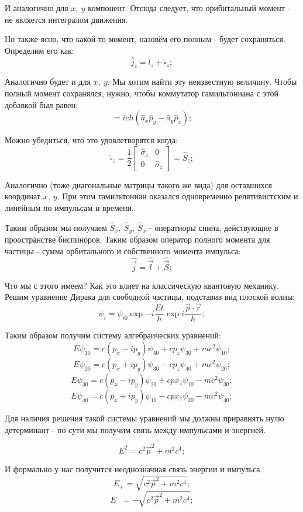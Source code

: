 \documentclass[a4paper, 14pt, russian]{article}
\newcommand{\be}{\begin{equation}}
\newcommand{\ee}{\end{equation}}
\begin{document}
	И аналогично для $x,~y$ компонент. Отсюда следует, что орибитальный момент - не является интегралом движения.

	Но также ясно, что какой-то момент, назовём его полным - будет сохраняться. Определим его как:
	\be
			\hat{j}_z = \hat{l}_z + \hat{\square}_z;
	\ee

	Аналогично будет и для $x,~y$. Мы хотим найти эту неизвестную величину. Чтобы 
	полный момент сохранялся, нужно, чтобы коммутатор гамильтониана с этой добавкой был равен:
	\be
			[\hat{H}; \hat{\square}_z] = ic \hbar (\hat{a}_x \hat{p}_y - \hat{a}_y \hat{p}_x);
	\ee

	Можно убедиться, что это удовлетворятся когда:
	\be
		\hat{\square}_z = \frac{1}{2} 
			\begin{bmatrix}
				\hat{\sigma}_z	&	0\\
				0	&	\hat{\sigma}_z
			\end{bmatrix} = \hat{S}_z;
	\ee

	Аналогично (тоже диагональные матрицы такого же вида) для оставшихся координат $x,~y$.
	При этом гамильтониан оказался одновременно релятивистским и линейным по импульсам и времени.

	Таким образом мы получаем $\hat{S}_x,~\hat{S}_y,~\hat{S}_x$ - оператиоры спина, действующие 
	в проостранстве биспиноров. Таким образом оператор полного момента для частицы - сумма
	орбитального и собственного момента импульса:
	\be
			\hat{\vec j} = \hat{\vec l} + \hat{\vec S};
	\ee

	Что мы с этого имеем? Как это влиет на классическую квантовую механику. Решим уравнение Дирака
	для свободной частицы, подставив вид плоской волны:
	\be
			\psi_i = \psi_{i0} \exp{-i\frac{Et}{\hbar}} \exp{i \frac{\vec p \cdot \vec r}{\hbar}};
	\ee

	Таким образом получим систему алгебраических уравнений:
	\be
			E\psi_{10} = c(p_x - i p_y) \psi_{40} + c p_z \psi_{30} + mc^2 \psi_{10};
	\ee
	\be
			E\psi_{20} = c(p_x + i p_y) \psi_{30} - c p_z \psi_{40} + mc^2 \psi_{20};
	\ee
	\be
			E\psi_{30} = c(p_x - i p_y) \psi_{20} + c px_z \psi_{10} - mc^2 \psi_{30};
	\ee
	\be
			E\psi_{40} = c(p_x + i p_y) \psi_{10} - c px_z \psi_{20} - mc^2 \psi_{40};
	\ee

	Для наличия решения такой системы уравнений мы должны приравнять нулю детерминант - 
	по сути мы получим связь между импульсами и энергией.

	\be
			E^2 = c^2 \vec{p}^2 + m^2 c^4;
	\ee

	И формально у нас получится неоднозначная связь энергии и импульса.
	\be
			E_{+} = \sqrt{c^2 \vec{p}^2 + m^2 c^4};
	\ee
	\be
			E_{-} = -\sqrt{c^2 \vec{p}^2 + m^2 c^4};
	\ee
\end{document}
